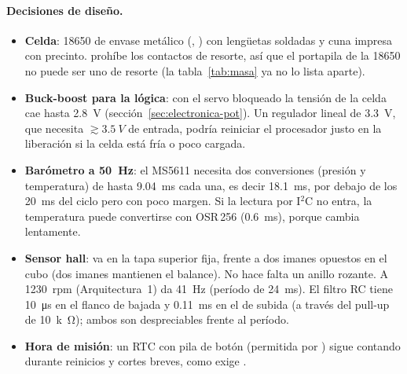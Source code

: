 \paragraph{Decisiones de diseño.}
\begin{itemize}
  \item \textbf{Celda}: 18650 de envase metálico (, ) con lengüetas
        soldadas y cuna impresa con precinto.  prohíbe los contactos de resorte,
        así que el portapila de la 18650 no puede ser uno de resorte (la tabla~\ref{tab:masa} ya no lo lista aparte).
  \item \textbf{Buck-boost para la lógica}: con el servo bloqueado la tensión de la celda cae
        hasta \SI{2.8}{V} (sección~\ref{sec:electronica-pot}). Un regulador lineal de
        \SI{3.3}{V}, que necesita $\gtrsim\SI{3.5}{V}$ de entrada, podría reiniciar el
        procesador justo en la liberación si la celda está fría o poco cargada.
  \item \textbf{Barómetro a \SI{50}{Hz}}: el MS5611 necesita dos conversiones (presión y
        temperatura) de hasta \SI{9.04}{ms} cada una, es decir \SI{18.1}{ms}, por debajo de
        los \SI{20}{ms} del ciclo pero con poco margen. Si la lectura por I$^2$C no entra,
        la temperatura puede convertirse con OSR\,256 (\SI{0.6}{ms}), porque cambia
        lentamente.
  \item \textbf{Sensor hall}: va en la tapa superior fija, frente a dos imanes opuestos en
        el cubo (dos imanes mantienen el balance). No hace falta un anillo rozante. A
        \SI{1230}{rpm} (Arquitectura~1) da \SI{41}{Hz} (período de \SI{24}{ms}). El filtro RC tiene
        \SI{10}{\micro s} en el flanco de bajada y \SI{0.11}{ms} en el de subida (a través
        del pull-up de \SI{10}{k\ohm}); ambos son despreciables frente al período.
  \item \textbf{Hora de misión}: un RTC con pila de botón (permitida por ) sigue
        contando durante reinicios y cortes breves, como exige .
\end{itemize}

